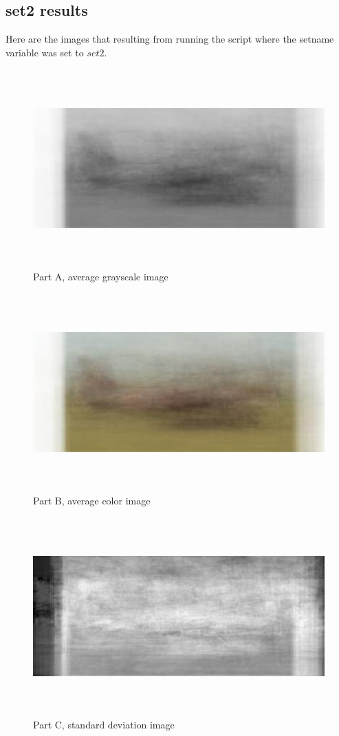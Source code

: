 \documentclass[11pt,psfig]{article}
\begin{document}
\subsection*{set2 results}

Here are the images that resulting from running the script where the setname variable was set to $set2$. 

\begin{figure}[H]
\centering
\includegraphics[height=3in]{set2grayscale.jpg}
\caption{Part A, average grayscale image}
\end{figure}

\begin{figure}[H]
\centering
\includegraphics[height=3in]{set2color.jpg}
\caption{Part B, average color image}
\end{figure}

\begin{figure}[H]
\centering
\includegraphics[height=3in]{set2grayscaleStndDev.jpg}
\caption{Part C, standard deviation image}
\end{figure}
\end{document}
